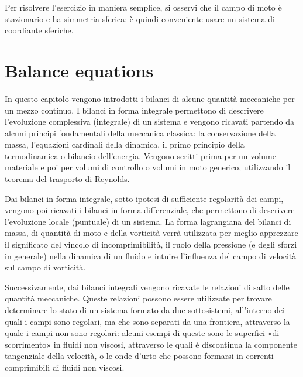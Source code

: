 \documentclass[letterpaper,10pt,italian]{jupyterBook}
\begin{document}
\sphinxAtStartPar
{} Per risolvere l’esercizio in maniera semplice, si
osservi che il campo di moto è stazionario e ha simmetria sferica: è
quindi conveniente usare un sistema di coordiante sferiche.

\sphinxstepscope


\chapter{Balance equations}
\label{\detokenize{polimi/fluidmechanics-ita/template/capitoli/04_bilanci/04teoria:balance-equations}}\label{\detokenize{polimi/fluidmechanics-ita/template/capitoli/04_bilanci/04teoria:fluid-mechanics-balances}}\label{\detokenize{polimi/fluidmechanics-ita/template/capitoli/04_bilanci/04teoria::doc}}
\sphinxAtStartPar
In questo capitolo vengono introdotti i bilanci di alcune quantità
meccaniche per un mezzo continuo. I bilanci in forma integrale
permettono di descrivere l’evoluzione complessiva (integrale) di un
sistema e vengono ricavati partendo da alcuni principi fondamentali
della meccanica classica: la conservazione della massa, l’equazioni
cardinali della dinamica, il primo principio della termodinamica o
bilancio dell’energia. Vengono scritti prima per un volume materiale e
poi per volumi di controllo o volumi in moto generico, utilizzando il
teorema del trasporto di Reynolds.

\sphinxAtStartPar
Dai bilanci in forma integrale, sotto ipotesi di sufficiente regolarità
dei campi, vengono poi ricavati i bilanci in forma differenziale, che
permettono di descrivere l’evoluzione locale (puntuale) di un sistema.
La forma lagrangiana del bilanci di massa, di quantità di moto e della
vorticità verrà utilizzata per meglio apprezzare il significato del
vincolo di incomprimibilità, il ruolo della pressione (e degli sforzi in
generale) nella dinamica di un fluido e intuire l’influenza del campo di
velocità sul campo di vorticità.

\sphinxAtStartPar
Successivamente, dai bilanci integrali vengono ricavate le relazioni di
salto delle quantità meccaniche. Queste relazioni possono essere
utilizzate per trovare determinare lo stato di un sistema formato da due
sotto\sphinxhyphen{}sistemi, all’interno dei quali i campi sono regolari, ma che sono
separati da una frontiera, attraverso la quale i campi non sono
regolari: alcuni esempi di queste sono le superfici «di scorrimento» in
fluidi non viscosi, attraverso le quali è discontinua la componente
tangenziale della velocità, o le onde d’urto che possono formarsi in
correnti comprimibili di fluidi non viscosi.
\end{document}
